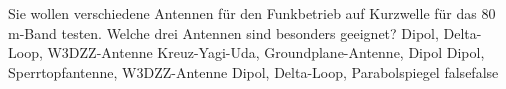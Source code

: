     {Sie wollen verschiedene Antennen für den Funkbetrieb auf Kurzwelle für das 80 m-Band testen. Welche drei Antennen sind besonders geeignet?  }
    {Dipol, Delta-Loop, W3DZZ-Antenne}
    {Kreuz-Yagi-Uda, Groundplane-Antenne, Dipol}
    {Dipol, Sperrtopfantenne, W3DZZ-Antenne}
    {Dipol, Delta-Loop, Parabolspiegel}
    {false}{false}